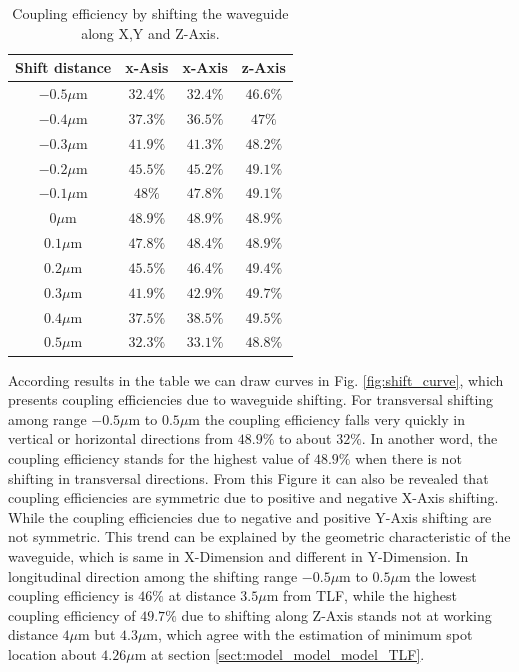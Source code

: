 \begin{table}[!ht]
\caption{Coupling efficiency by shifting the waveguide along X,Y and Z-Axis.}
\centering
\begin{tabular}{c|ccc}
\hline
Shift distance & x-Asis & x-Axis & z-Axis \\
\hline
$-0.5\mu$m 		&$32.4\%$	&$32.4\%$&$46.6\%$	\\
$-0.4\mu$m		&$37.3\%$	&$36.5\%$&$47\%$	\\
$-0.3\mu$m 		&$41.9\%$	&$41.3\%$&$48.2\%$	\\
$-0.2\mu$m	  &$45.5\%$	&$45.2\%$&$49.1\%$	\\
$-0.1\mu$m		&$48\%$	&$47.8\%$&$49.1\%$	\\
$0\mu$m			  &$48.9\%$	&$48.9\%$&$48.9\%$	\\
$0.1\mu$m			&$47.8\%$	&$48.4\%$&$48.9\%$	\\
$0.2\mu$m			&$45.5\%$	&$46.4\%$&$49.4\%$	\\
$0.3\mu$m			&$41.9\%$	&$42.9\%$&$49.7\%$	\\
$0.4\mu$m			&$37.5\%$	&$38.5\%$&$49.5\%$	\\
$0.5\mu$m			&$32.3\%$	&$33.1\%$&$48.8\%$	\\
\hline
\end{tabular}
\label{tab:shift_result}
\end{table}
According results in the table we can draw curves in Fig. \ref{fig:shift_curve}, which presents coupling efficiencies due to waveguide shifting. For transversal shifting among range $-0.5\mu$m to $0.5\mu$m the coupling efficiency falls very quickly in vertical or horizontal directions from $48.9\%$ to about $32\%$.  In another word, the coupling efficiency stands for the highest value of $48.9\%$ when there is not shifting in transversal directions. From this Figure it can also be revealed that coupling efficiencies are symmetric due to positive and negative X-Axis shifting. While the coupling efficiencies due to negative and positive Y-Axis shifting are not symmetric. This trend can be explained by the geometric characteristic of the waveguide, which is same in X-Dimension and different in Y-Dimension.  In longitudinal direction among the shifting range $-0.5\mu$m to $0.5\mu$m the lowest coupling efficiency is $46\%$ at distance $3.5\mu$m from TLF, while the highest coupling efficiency of $49.7\%$ due to shifting along Z-Axis stands not at working distance $4\mu$m but $4.3\mu$m, which agree with the estimation of minimum spot location about $4.26\mu$m at section \ref{sect:model_model_model_TLF}. \\

